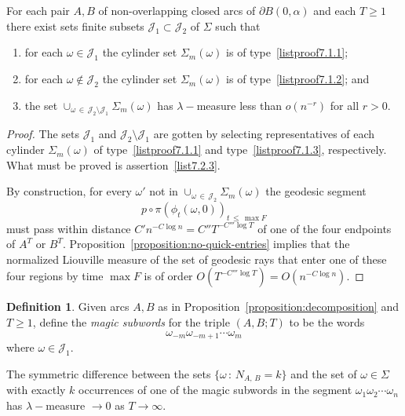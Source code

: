 \documentclass[10pt]{amsart}
\theoremstyle{definition}\newtheorem{defi}[theo]{Definition}\newtheorem{rema}[theo]{Remark}\newtheorem{exam}[theo]{Example}\newtheorem{exem}[theo]{Example}\newtheorem{nota}[theo]{Notation}
\newcommand*{\Alphenumi}{\renewcommand*{\theenumi}{\Alph{enumi}}}
\begin{document}
\begin{prop}\label{proposition:decomposition}
For each pair $A,B$ of non-overlapping closed arcs of $\partial B (0,\alpha)$ and each $T\geq 1$ there exist sets finite subsets $\mathcal{J}_{1}\subset \mathcal{J}_{2}$ of $\Sigma$ such that
\begin{enumerate}\Alphenumi
\item  \label{list7.2.1}for each $\omega \in\mathcal{J}_{1}$ the cylinder set $\Sigma_{m}(\omega)$ is of type~\eqref{listproof7.1.1};
\item \label{list7.2.2} for each $\omega \not\in\mathcal{J}_{2}$ the cylinder set $\Sigma_{m}(\omega)$ is of type~\eqref{listproof7.1.2}; and
\item \label{list7.2.3} the set $\cup_{\omega\,\in\, \mathcal{J}_{2}\setminus\mathcal{J}_{1}}\Sigma_{m}(\omega)$ has $\lambda-$measure less than $o(n^{-r})$ for all $r>0$.
\end{enumerate}
\end{prop}

\begin{proof}
The sets $\mathcal{J}_{1}$ and $\mathcal{J}_{2}\setminus
\mathcal{J}_{1}$ are gotten by selecting representatives of each cylinder $\Sigma_{m}(\omega)$ of type~\eqref{listproof7.1.1} and type~\eqref{listproof7.1.3}, respectively. What must be proved is assertion~\eqref{list7.2.3}.

By construction, for every $\omega '$ not in $\cup_{\omega\,\in\,\mathcal{J}_{2}}\Sigma_{m}(\omega)$ the geodesic segment
\[
p\circ\pi (\phi_{t}(\omega,0))_{t\,\leq\,\max F}
\]
must pass within distance $C'n^{-C\log n}=C'' T ^{-C''' \log T}$ of one of the four endpoints of $A^{T}$ or $B^{T}$. Proposition~\ref{proposition:no-quick-entries} implies that the normalized Liouville measure of the set of geodesic rays that enter one of these four regions by time $\max F$ is of order $O(T ^{-C''' \log T})=O(n^{-C \log n})$.
\end{proof}

\begin{defi}\label{definition:magicSubwords}
Given arcs $A,B$ as in Proposition~\ref{proposition:decomposition} and $T\geq 1$, define the \emph{magic subwords} for the triple $(A,B;T)$ to be the words
\[
\omega_{-m}\omega_{-m+1}\cdots \omega_{m}
\]
where $\omega \in \mathcal{J}_{1}$.
\end{defi}

\begin{coro}\label{corollary:magicSubwordCounts}
The symmetric difference between the sets $\{\omega \,:\, N_{A,\,B}=k\}$ and the set of $\omega \in \Sigma$ with exactly $k$ occurrences of one of the magic subwords in the segment $\omega_{1}\omega_{2}\dotsb \omega_{n}$ has $\lambda -$measure $\rightarrow 0$ as $T \rightarrow\infty$.
\end{coro}
\end{document}
